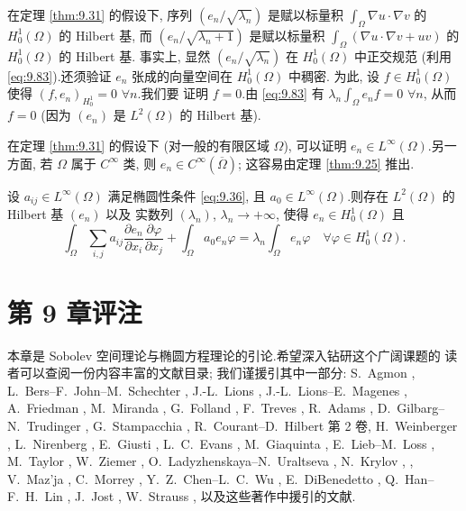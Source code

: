 \begin{remark}
\label{rem:9.28}
在定理  \ref{thm:9.31} 的假设下, 序列 $(e_n/\sqrt{\lambda_n})$ 是赋以标量积
$\int_\Omega\nabla u\cdot\nabla v$ 的 $H_0^1(\Omega)$ 的 Hilbert 基, 而
$(e_n/\sqrt{\lambda_n+1})$ 是赋以标量积
$\int_\Omega(\nabla u\cdot\nabla v+uv)$ 的 $H_0^1(\Omega)$ 的 Hilbert 基.
事实上, 显然 $(e_n/\sqrt{\lambda_n})$ 在 $H_0^1(\Omega)$ 中正交规范 (利用
\eqref{eq:9.83}).还须验证 $e_n$ 张成的向量空间在 $H_0^1(\Omega)$ 中稠密.
为此, 设 $f\in H_0^1(\Omega)$ 使得 $(f,e_n)_{H_0^1}=0$ $\forall n$.我们要
证明 $f=0$.由 \eqref{eq:9.83} 有 $\lambda_n\int_\Omega e_nf=0$ $\forall n$,
从而 $f=0$ (因为 $(e_n)$ 是 $L^2(\Omega)$ 的 Hilbert 基).
\end{remark}

\begin{remark}
\label{rem:9.29}
在定理  \ref{thm:9.31} 的假设下 (对一般的有限区域 $\Omega$), 可以证明
$e_n\in L^\infty(\Omega)$.另一方面, 若 $\Omega$ 属于 $C^\infty$ 类, 则
$e_n\in C^\infty(\overline\Omega)$; 这容易由定理  \ref{thm:9.25} 推出.
\end{remark}

\begin{remark}
\label{rem:9.30}
设 $a_{ij}\in L^\infty(\Omega)$ 满足椭圆性条件 \eqref{eq:9.36}, 且
$a_0\in L^\infty(\Omega)$.则存在 $L^2(\Omega)$ 的 Hilbert 基 $(e_n)$ 以及
实数列 $(\lambda_n)$, $\lambda_n\to+\infty$, 使得 $e_n\in H_0^1(\Omega)$ 且
\begin{equation*}
\int_\Omega\sum_{i,j}a_{ij}\frac{\partial e_n}{\partial x_i}
\frac{\partial\varphi}{\partial x_j}+\int_\Omega a_0e_n\varphi
=\lambda_n\int_\Omega e_n\varphi\quad\forall\varphi\in H_0^1(\Omega).
\end{equation*}
\end{remark}

\section*{第 9 章评注}

本章是 Sobolev 空间理论与椭圆方程理论的引论.希望深入钻研这个广阔课题的
读者可以查阅一份内容丰富的文献目录; 我们谨援引其中一部分:
S.~Agmon , L.~Bers--F.~John--M.~Schechter
, J.-L.~Lions ,
J.-L.~Lions--E.~Magenes , A.~Friedman
, M.~Miranda , G.~Folland
, F.~Treves , R.~Adams ,
D.~Gilbarg--N.~Trudinger ,
G.~Stampacchia , R.~Courant--D.~Hilbert
 第 2 卷, H.~Weinberger ,
L.~Nirenberg , E.~Giusti ,
L.~C.~Evans , M.~Giaquinta ,
E.~Lieb--M.~Loss , M.~Taylor ,
W.~Ziemer , O.~Ladyzhenskaya--N.~Uraltseva
, N.~Krylov , ,
V.~Maz'ja , C.~Morrey ,
Y.~Z.~Chen--L.~C.~Wu , E.~DiBenedetto
, Q.~Han--F.~H.~Lin , J.~Jost
, W.~Strauss , 以及这些著作中援引的文献.

